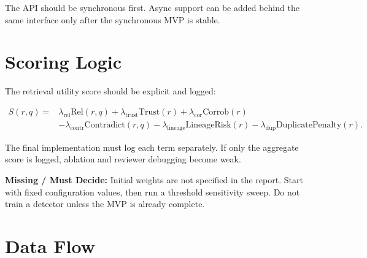 \documentclass[11pt,oneside]{report}
\newcommand{\missing}{\textbf{Missing / Must Decide: }}
\begin{document}
The API should be synchronous first. Async support can be added behind the same interface only after
the synchronous MVP is stable.

\section{Scoring Logic}

The retrieval utility score should be explicit and logged:

\[
\begin{aligned}
S(r, q) ={}&
\lambda_{\mathrm{rel}}\mathrm{Rel}(r,q)
+ \lambda_{\mathrm{trust}}\mathrm{Trust}(r)
+ \lambda_{\mathrm{cor}}\mathrm{Corrob}(r)\\
&- \lambda_{\mathrm{contr}}\mathrm{Contradict}(r,q)
- \lambda_{\mathrm{lineage}}\mathrm{LineageRisk}(r)
- \lambda_{\mathrm{dup}}\mathrm{DuplicatePenalty}(r).
\end{aligned}
\]

The final implementation must log each term separately. If only the aggregate score is logged,
ablation and reviewer debugging become weak.

\missing{} Initial weights are not specified in the report. Start with fixed configuration values,
then run a threshold sensitivity sweep. Do not train a detector unless the MVP is already complete.

\section{Data Flow}
\end{document}
